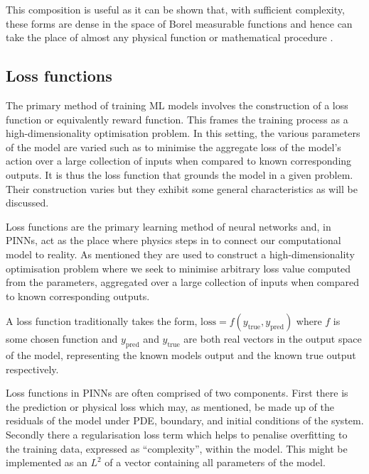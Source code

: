 This composition is useful as it can be shown that, with sufficient complexity, these forms are dense in the space of Borel measurable functions and hence can take the place of almost any physical function or mathematical procedure \cite{hornikMultilayerFeedforwardNetworks1989}.

\subsection{Loss functions}
\label{sec:intro-lf}

The primary method of training ML models involves the construction of a loss function or equivalently reward function. This frames the training process as a high-dimensionality optimisation problem. In this setting, the various parameters of the model are varied such as to minimise the aggregate loss of the model's action over a large collection of inputs when compared to known corresponding outputs. It is thus the loss function that grounds the model in a given problem. Their construction varies but they exhibit some general characteristics as will be discussed.


Loss functions are the primary learning method of neural networks and, in PINNs, act as the place where physics steps in to connect our computational model to reality. As mentioned they are used to construct a high-dimensionality optimisation problem where we seek to minimise arbitrary loss value computed from the parameters, aggregated over a large collection of inputs when compared to known corresponding outputs.

A loss function traditionally takes the form, $\mathrm{loss} = f(y_{\text{true}}, y_{\text{pred}})$ where $f$ is some chosen function and $y_{\text{pred}}$ and $y_{\text{true}}$ are both real vectors in the output space of the model, representing the known models output and the known true output respectively.

Loss functions in PINNs are often comprised of two components. First there is the prediction or physical loss which may, as mentioned, be made up of the residuals of the model under PDE, boundary, and initial conditions of the system. Secondly there a regularisation loss term which helps to penalise overfitting to the training data, expressed as \enquote{complexity}, within the model. This might be implemented as an $L^2$ of a vector containing all parameters of the model.

